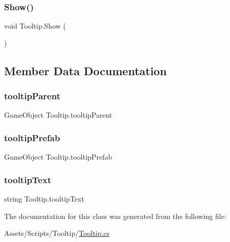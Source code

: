 \mbox{\label{classTooltip_ad15715a262e1c7c27db36cba7da3149f}} 
\subsubsection{\texorpdfstring{Show()}{Show()}}
{\footnotesize\ttfamily void Tooltip.\+Show (\begin{DoxyParamCaption}{ }\end{DoxyParamCaption})\hspace{0.3cm}{\ttfamily [inline]}}



\subsection{Member Data Documentation}
\mbox{\label{classTooltip_a58db06fa78d7d032bee7492976b4465c}} 
\subsubsection{\texorpdfstring{tooltip\+Parent}{tooltipParent}}
{\footnotesize\ttfamily Game\+Object Tooltip.\+tooltip\+Parent}

\mbox{\label{classTooltip_a9e16563f3ea6f787045747f3bbc9cf9e}} 
\subsubsection{\texorpdfstring{tooltip\+Prefab}{tooltipPrefab}}
{\footnotesize\ttfamily Game\+Object Tooltip.\+tooltip\+Prefab}

\mbox{\label{classTooltip_ae1fbc466dbee2cd63d8b68df52f5b284}} 
\subsubsection{\texorpdfstring{tooltip\+Text}{tooltipText}}
{\footnotesize\ttfamily string Tooltip.\+tooltip\+Text}



The documentation for this class was generated from the following file\+:\begin{DoxyCompactItemize}
\item 
Assets/\+Scripts/\+Tooltip/\hyperlink{Tooltip_8cs}{Tooltip.\+cs}\end{DoxyCompactItemize}

